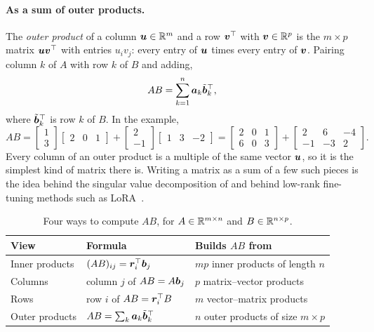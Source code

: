 \paragraph{As a sum of outer products.}
The \emph{outer product} of a column $\bm{u} \in \mathbb{R}^m$ and a row
$\bm{v}^\top$ with $\bm{v} \in \mathbb{R}^p$ is the $m \times p$ matrix
$\bm{u}\bm{v}^\top$ with entries $u_i v_j$: every entry of $\bm{u}$
times every entry of $\bm{v}$. Pairing column $k$ of $A$ with row $k$ of
$B$ and adding,
\begin{equation}
  AB = \sum_{k=1}^n \bm{a}_k \tilde{\bm{b}}_k^\top ,
  \label{eq:ch03-outer}
\end{equation}
where $\tilde{\bm{b}}_k^\top$ is row $k$ of $B$. In the example,
\[
  AB =
  \begin{bmatrix} 1 \\ 3 \end{bmatrix}
  \begin{bmatrix} 2 & 0 & 1 \end{bmatrix}
  +
  \begin{bmatrix} 2 \\ -1 \end{bmatrix}
  \begin{bmatrix} 1 & 3 & -2 \end{bmatrix}
  =
  \begin{bmatrix} 2 & 0 & 1 \\ 6 & 0 & 3 \end{bmatrix}
  +
  \begin{bmatrix} 2 & 6 & -4 \\ -1 & -3 & 2 \end{bmatrix}.
\]
Every column of an outer product is a multiple of the same vector
$\bm{u}$, so it is the simplest kind of matrix there is. Writing a
matrix as a sum of a few such pieces is the idea behind the singular value
decomposition of  and behind low-rank fine-tuning methods
such as LoRA~\cite{hu2022lora}.

\begin{table}[ht]
  \centering
  \caption{Four ways to compute $AB$, for $A \in \mathbb{R}^{m \times n}$ and
    $B \in \mathbb{R}^{n \times p}$.}
  \label{tab:ch03-four-views}
  \begin{tabular}{@{}lll@{}}
    \toprule
    View & Formula & Builds $AB$ from \\
    \midrule
    Inner products & $(AB)_{ij} = \bm{r}_i^\top \bm{b}_j$
      & $mp$ inner products of length $n$ \\
    Columns & column $j$ of $AB = A\bm{b}_j$
      & $p$ matrix--vector products \\
    Rows & row $i$ of $AB = \bm{r}_i^\top B$
      & $m$ vector--matrix products \\
    Outer products & $AB = \sum_k \bm{a}_k \tilde{\bm{b}}_k^\top$
      & $n$ outer products of size $m \times p$ \\
    \bottomrule
  \end{tabular}
\end{table}

